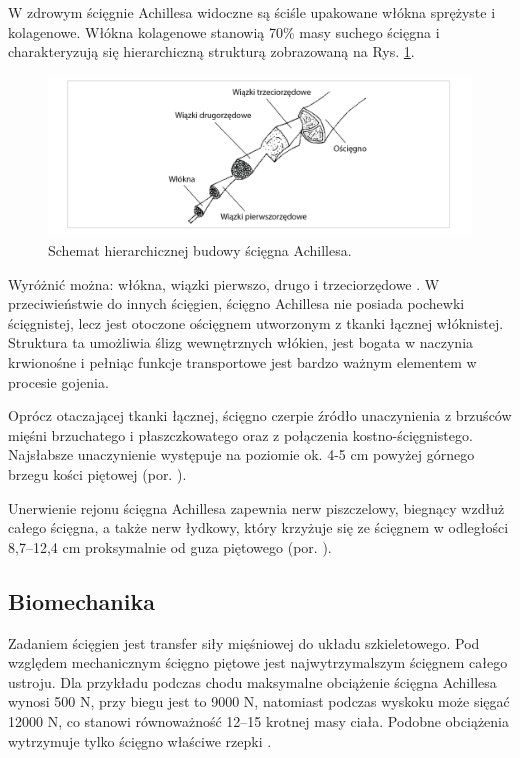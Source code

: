 W zdrowym ścięgnie Achillesa widoczne są ściśle upakowane włókna sprężyste i kolagenowe. Włókna kolagenowe stanowią 70\% masy suchego ścięgna i charakteryzują się hierarchiczną strukturą zobrazowaną na Rys. \ref{Achilles-histology}.  
\begin{figure}[h!]
	\centering
	\includegraphics[width=1\textwidth]{figures/Achilles_hist.png}
	\caption{Schemat hierarchicznej budowy ścięgna Achillesa.}
	\label{Achilles-histology}
\end{figure}

Wyróżnić można: włókna, wiązki pierwszo, drugo i trzeciorzędowe \cite{Sharma2006}. W przeciwieństwie do innych ścięgien, ścięgno Achillesa nie posiada pochewki ścięgnistej, lecz jest otoczone ościęgnem utworzonym z tkanki łącznej włóknistej. Struktura ta umożliwia ślizg wewnętrznych włókien, jest bogata w naczynia krwionośne i pełniąc funkcje transportowe jest bardzo ważnym elementem w procesie gojenia. 

Oprócz otaczającej tkanki łącznej, ścięgno czerpie źródło unaczynienia z brzuśców mięśni brzuchatego i płaszczkowatego oraz z połączenia kostno-ścięgnistego. Najsłabsze unaczynienie występuje na poziomie ok. 4-5 cm powyżej górnego brzegu kości piętowej (por. \cite{bochenek2016anatomia}).

Unerwienie rejonu ścięgna Achillesa zapewnia nerw piszczelowy, biegnący wzdłuż całego ścięgna, a także nerw łydkowy, który krzyżuje się ze ścięgnem w odległości 8,7--12,4 cm proksymalnie od guza piętowego (por. \cite{bochenek2016anatomia}). 

\subsection{Biomechanika}
\label{Biomechanika}
Zadaniem ścięgien jest transfer siły mięśniowej do układu szkieletowego. Pod względem mechanicznym ścięgno piętowe jest najwytrzymalszym ścięgnem całego ustroju. Dla przykładu podczas chodu maksymalne obciążenie ścięgna Achillesa wynosi 500 N, przy biegu jest to 9000 N, natomiast podczas wyskoku może sięgać 12000 N, co stanowi równoważność 12--15 krotnej masy ciała. Podobne obciążenia wytrzymuje tylko ścięgno właściwe rzepki \cite{Etiologia}.

